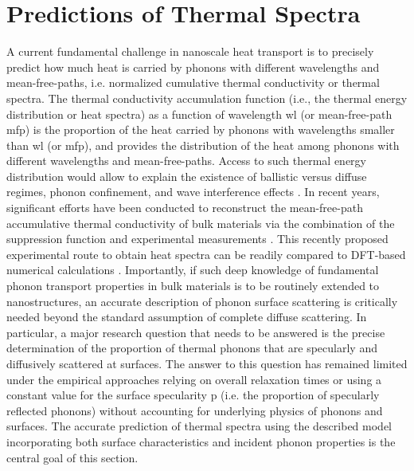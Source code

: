 \section{Predictions of Thermal Spectra}
\label{sec:pred_thermalspectra}
A current fundamental challenge in nanoscale heat transport is to precisely predict how much heat is carried by phonons with different wavelengths and mean-free-paths, i.e. normalized cumulative thermal conductivity or thermal spectra. The thermal conductivity accumulation function (i.e., the thermal energy distribution or heat spectra) as a function of wavelength \gls{wl} (or mean-free-path \gls{mfp}) is the proportion of the heat carried by phonons with wavelengths smaller than \gls{wl} (or \gls{mfp}), and provides the distribution of the heat among phonons with different wavelengths and mean-free-paths. Access to such thermal energy distribution would allow to explain the existence of ballistic versus diffuse regimes, phonon confinement, and wave interference effects \cite{RN362}. In recent years, significant efforts have been conducted to reconstruct the mean-free-path accumulative thermal conductivity of bulk materials via the combination of the suppression function and experimental measurements \cite{RN236,RN273,RN217,RN129}. This recently proposed experimental route to obtain heat spectra can be readily compared to DFT-based numerical calculations \cite{stokes_bulkSi_tau}. Importantly, if such deep knowledge of fundamental phonon transport properties in bulk materials is to be routinely extended to nanostructures, an accurate description of phonon surface scattering is critically needed beyond the standard assumption of complete diffuse scattering. In particular, a major research question that needs to be answered is the precise determination of the proportion of thermal phonons that are specularly and diffusively scattered at surfaces. The answer to this question has remained limited under the empirical approaches relying on overall relaxation times or using a constant value for the surface specularity \gls{p} (i.e. the proportion of specularly reflected phonons) without accounting for underlying physics of phonons and surfaces. The accurate prediction of thermal spectra using the described model incorporating both surface characteristics and incident phonon properties is the central goal of this section.
